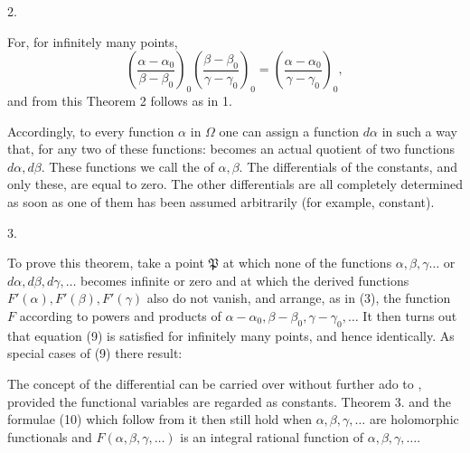 
2. 

For, for infinitely many points,
\[
\left(\frac{\alpha-\alpha_0}{\beta-\beta_0}\right)_0 \left(\frac{\beta-\beta_0}{\gamma-\gamma_0}\right)_0 = \left(\frac{\alpha-\alpha_0}{\gamma-\gamma_0}\right)_0,
\]
and from this Theorem 2 follows as in 1.

Accordingly, to every function $\alpha$ in $\Omega$ one can assign a function $d\alpha$ in such a way that, for any two of these functions:
becomes an actual quotient of two functions $d\alpha, d\beta$. These functions we call the  of $\alpha, \beta$. The differentials of the constants, and only these, are equal to zero. The other differentials are all completely determined as soon as one of them has been assumed arbitrarily (for example, constant).

3. 

To prove this theorem, take a point $\mathfrak{P}$ at which none of the functions $\alpha, \beta, \gamma \ldots$ or $d\alpha, d\beta, d\gamma, \ldots$ becomes infinite or zero and at which the derived functions $F'(\alpha), F'(\beta), F'(\gamma)$ also do not vanish, and arrange, as in (3), the function $F$ according to powers and products of $\alpha - \alpha_0, \beta - \beta_0, \gamma - \gamma_0, \ldots$ It then turns out that equation (9) is satisfied for infinitely many points, and hence identically. As special cases of (9) there result:

The concept of the differential can be carried over without further ado to , provided the functional variables are regarded as constants. Theorem 3. and the formulae (10) which follow from it then still hold when $\alpha, \beta, \gamma, \ldots$ are holomorphic functionals and $F(\alpha, \beta, \gamma, \ldots)$ is an integral rational function of $\alpha, \beta, \gamma, \ldots$.
